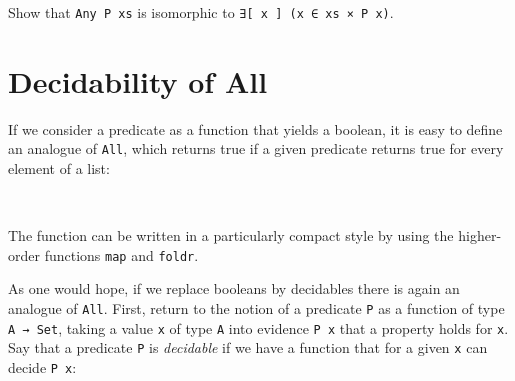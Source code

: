 Show that \texttt{Any\ P\ xs} is isomorphic to
\texttt{∃{[}\ x\ {]}\ (x\ ∈\ xs\ ×\ P\ x)}.

\begin{fence}
\begin{code}%
\>[0]\<%
\end{code}
\end{fence}

\hypertarget{decidability-of-all}{%
\section{Decidability of All}\label{decidability-of-all}}

If we consider a predicate as a function that yields a boolean, it is
easy to define an analogue of \texttt{All}, which returns true if a
given predicate returns true for every element of a list:

\begin{fence}
\begin{code}%
\>[0]\AgdaSpace{}%
\AgdaSymbol{:}\AgdaSpace{}%
\AgdaSpace{}%
\AgdaSymbol{\{}\AgdaSpace{}%
\AgdaSymbol{:}\AgdaSpace{}%
\AgdaSymbol{\}}\AgdaSpace{}%
\AgdaSpace{}%
\AgdaSymbol{(}\AgdaSpace{}%
\AgdaSpace{}%
\AgdaSymbol{)}\AgdaSpace{}%
\AgdaSpace{}%
\AgdaSpace{}%
\AgdaSpace{}%
\AgdaSpace{}%
\<%
\\
\>[0]\AgdaSpace{}%
%
\>[7]\AgdaSymbol{=}%
\>[10]\AgdaSpace{}%
\AgdaSpace{}%
\AgdaSpace{}%
\AgdaSpace{}%
\AgdaSpace{}%
\<%
\end{code}
\end{fence}

The function can be written in a particularly compact style by using the
higher-order functions \texttt{map} and \texttt{foldr}.

As one would hope, if we replace booleans by decidables there is again
an analogue of \texttt{All}. First, return to the notion of a predicate
\texttt{P} as a function of type \texttt{A\ →\ Set}, taking a value
\texttt{x} of type \texttt{A} into evidence \texttt{P\ x} that a
property holds for \texttt{x}. Say that a predicate \texttt{P} is
\emph{decidable} if we have a function that for a given \texttt{x} can
decide \texttt{P\ x}:

